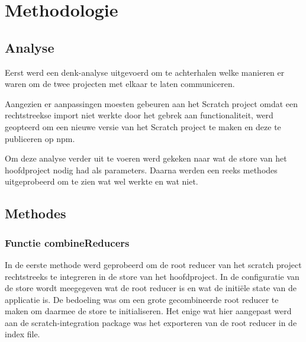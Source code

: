 
\chapter{Methodologie}
\label{ch:methodologie}


\section{Analyse}
Eerst werd een denk-analyse uitgevoerd om te achterhalen welke manieren er waren om de twee projecten met elkaar te laten communiceren.

Aangezien er aanpassingen moesten gebeuren aan het Scratch project omdat een rechtstreekse import niet werkte door het gebrek aan functionaliteit, werd geopteerd om een nieuwe versie van het Scratch project te maken en deze te publiceren op npm. 

Om deze analyse verder uit te voeren werd gekeken naar wat de store van het hoofdproject nodig had als parameters. Daarna werden een reeks methodes uitgeprobeerd om te zien wat wel werkte en wat niet.


\section{Methodes}
\subsection{Functie combineReducers}
In de eerste methode werd geprobeerd om de root reducer van het scratch project rechtstreeks te integreren in de store van het hoofdproject. In de configuratie van de store wordt meegegeven wat de root reducer is en wat de initiële state van de applicatie is. De bedoeling was om een grote gecombineerde root reducer te maken om daarmee de store te initialiseren. Het enige wat hier aangepast werd aan de scratch-integration package was het exporteren van de root reducer in de index file.

